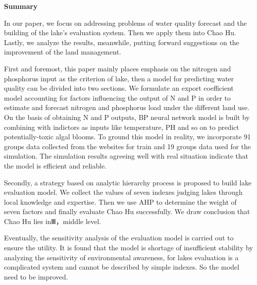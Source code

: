\thispagestyle{empty}

\vspace{-0.7cm}
\begin{footnotesize}

    \begin{center}
        \textbf{Summary}
    \end{center}
\par
In our paper, we focus on addressing problems of water quality forecast and the building of the lake’s evaluation system. Then we apply them into Chao Hu. Lastly, we analyze the results, meanwhile, putting forward suggestions on the improvement of the land management.\par
First and foremost, this paper mainly places emphasis on the nitrogen and phosphorus input as the criterion of lake, then a model for predicting water quality can be divided into two sections. We formulate an export coefficient model accounting for factors influencing the output of N and P in order to estimate and forecast nitrogen and phosphorus load under the different land use. On the basis of obtaining N and P outputs, BP neural network model is built by combining with indictors as inputs like temperature, PH and so on to predict potentially-toxic algal blooms. To ground this model in reality, we incorporate 91 groups data collected from the websites for train and 19 groups data used for the simulation. The simulation results agreeing well with real situation indicate that the model is efficient and reliable.\par
Secondly, a strategy based on analytic hierarchy process is proposed to build lake evaluation model. We collect the values of seven indexes judging lakes through local knowledge and expertise. Then we use AHP to determine the weight of seven factors and finally evaluate Chao Hu successfully. We draw conclusion that Chao Hu lies inⅢ，middle level.\par
Eventually, the sensitivity analysis of the evaluation model is carried out to ensure the utility. It is found that the model is shortage of insufficient stability by analyzing the sensitivity of environmental awareness, for lakes evaluation is a complicated system and cannot be described by simple indexes. So the model need to be improved.\par
\end{footnotesize}



